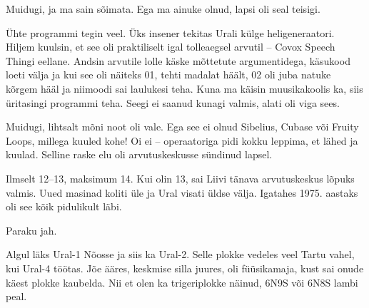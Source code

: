 
Muidugi, ja ma sain sõimata. Ega ma ainuke olnud, lapsi oli seal
teisigi.

Ühte programmi tegin veel. Üks insener 
tekitas Urali külge heli{\-}generaatori. Hiljem kuulsin, et 
see oli praktiliselt igal tolleaegsel arvutil -- Covox Speech 
Thingi 
eellane. Andsin arvutile lolle käske 
mõttetute argumentidega, käsukood loeti välja ja kui see oli näiteks 01, tehti 
madalat häält, 02 oli juba natuke kõrgem hääl ja niimoodi sai laulukesi 
teha. Kuna ma käisin muusikakoolis ka, siis üritasingi programmi teha. 
Seegi ei saanud kunagi valmis, alati oli viga sees. 


Muidugi, lihtsalt mõni noot oli vale. Ega see ei olnud 
Sibelius, Cubase või Fruity Loops, millega kuuled kohe! Oi ei -- operaatoriga pidi kokku leppima, et lähed ja kuulad. 
Selline raske elu oli arvutuskeskusse sündinud lapsel. 


Ilmselt 12--13, maksimum 
14. Kui olin 13, sai Liivi tänava arvutuskeskus lõpuks valmis. Uued masinad koliti üle 
ja Ural visati üldse välja. Igatahes 1975. 
aastaks oli see kõik pidulikult läbi. 


Paraku jah. 

Algul läks Ural-1 
Nõosse ja siis ka Ural-2. Selle
plokke vedeles veel Tartu vahel, kui Ural-4 töötas. Jõe 
ääres, keskmise silla juures, oli füüsikamaja, kust sai onude 
käest plokke kaubelda. Nii et olen ka trigeriplokke 
näinud, 6N9S või 6N8S lambi peal. 

